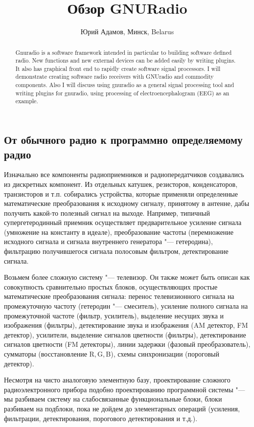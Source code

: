 \documentclass[10pt, a5paper]{article}
\begin{document}
\title{Обзор GNURadio}
\author{Юрий Адамов, Минск, Belarus}
\maketitle
\begin{abstract}
Gnuradio is a software framework intended in particular to building software defined radio. New functions and new external devices can be added easily by writing plugins. It also has graphical front end to rapidly create software signal processors.
I will demonstrate creating software radio receivers with GNUradio and commodity components.
Also I will discuss using gnuradio as a general signal processing tool and writing plugins for gnuradio, using processing of electroencephalogram (EEG) as an example.
\end{abstract}
\subsection*{От обычного радио к программно определяемому радио}

Изначально все компоненты радиоприемников и радиопередатчиков создавались из дискретных компонент. Из отдельных катушек, резисторов,  конденсаторов, транзисторов и т.п. собирались устройства, которые применяли определенные математические преобразования к исходному сигналу, принятому в антенне, дабы получить какой-то полезный сигнал на выходе. Например, типичный супергетеродинный приемник осуществляет предварительное усиление сигнала (умножение на константу в идеале), преобразование частоты (перемножение исходного сигнала и сигнала внутреннего генератора "--- гетеродина), фильтрацию получившегося сигнала полосовым фильтром, детектирование сигнала.

Возьмем более сложную систему "--- телевизор. Он также может быть описан как совокупность сравнительно простых блоков, осуществляющих простые математические преобразования сигнала: перенос телевизионного сигнала на промежуточную частоту (гетеродин "--- смеситель), усиление полного сигнала на промежуточной частоте (фильтр, усилитель), выделение несущих звука и изображения (фильтры), детектирование звука и изображения (AM детектор, FM детектор), усилители, выделение сигналов цветности (фильтры), детектирование сигналов цветности (FM детекторы), линии задержки (фазовый преобразователь), сумматоры (восстановление R,\,G,\,B), схемы синхронизации (пороговый детектор).

Несмотря на чисто аналоговую элементную базу, проектирование сложного радиоэлектронного прибора подобно проектированию программной системы "--- мы разбиваем систему на слабосвязанные функциональные блоки, блоки разбиваем на подблоки, пока не дойдем до элементарных операций (усиления, фильтрации, детектирования, порогового детектирования и т.д.).
\end{document}

